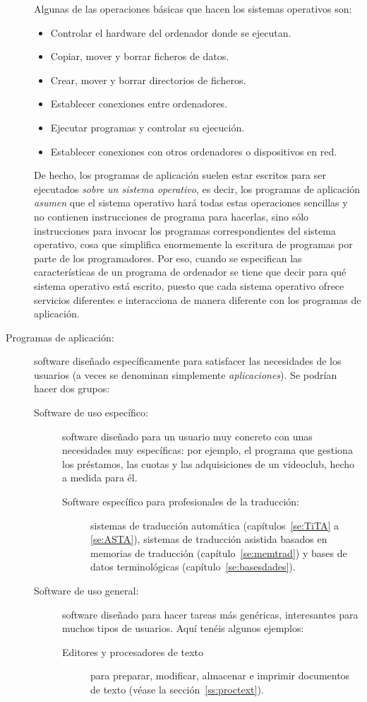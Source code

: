 \begin{description}
Algunas de las operaciones básicas que hacen los sistemas operativos son: \begin{itemize} \item Controlar el hardware del ordenador donde se ejecutan. \item Copiar, mover y borrar ficheros de datos. \item Crear, mover y borrar directorios de ficheros. \item Establecer conexiones entre ordenadores. \item Ejecutar programas y controlar su ejecución. \item Establecer conexiones con otros ordenadores o dispositivos en red. \end{itemize} De hecho, los programas de aplicación suelen estar escritos para ser ejecutados \emph{sobre un sistema operativo}, es decir, los programas de aplicación \emph{asumen} que el sistema operativo hará todas estas operaciones sencillas y no contienen instrucciones de programa para hacerlas, sino sólo instrucciones para invocar los programas correspondientes del sistema operativo, cosa que simplifica enormemente la escritura de programas por parte de los programadores. Por eso, cuando se especifican las características de un programa de ordenador se tiene que decir para qué sistema operativo está escrito, puesto que cada sistema operativo ofrece servicios diferentes e interacciona de manera diferente con los programas de aplicación. 

\item[Programas de aplicación:] software diseñado específicamente para satisfacer las necesidades de los usuarios (a veces se denominan simplemente {\em aplicaciones}). Se podrían hacer dos grupos: \begin{description} \item[Software de uso específico:] software diseñado para un usuario muy concreto con unas necesidades muy específicas: por ejemplo, el programa que gestiona los préstamos, las cuotas y las adquisiciones de un videoclub, hecho a medida para él. \begin{description} \item[Software específico para profesionales de la traducción:] sistemas de traducción automática (capítulos~\ref{se:TiTA} a \ref{se:ASTA}), sistemas de traducción asistida basados en memorias de traducción (capítulo~\ref{se:memtrad}) y bases de datos terminológicas (capítulo~\ref{se:basesdades}). \end{description} \item[Software de uso general:] software diseñado para hacer tareas más genéricas, interesantes para muchos tipos de usuarios. Aquí tenéis algunos ejemplos: \begin{description} \item[Editores y procesadores de texto] para preparar, modificar, almacenar e imprimir documentos de texto (véase la sección~\ref{ss:proctext}). 


\end{description}
\end{description}
\end{description}
